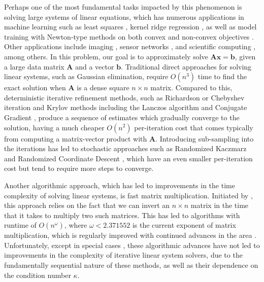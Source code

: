 \documentclass[11pt]{article}
\def\x{{\mathbf x}}
\def\b{{\mathbf b}}
\def\A{{\mathbf A}}
\begin{document}
Perhaps one of the most fundamental tasks impacted by this phenomenon is solving large systems of linear equations, which has numerous applications in machine learning such as least squares \cite{dieuleveut2017harder}, kernel ridge regression \cite{alaoui2015fast}, as well as model training with Newton-type methods on both convex and non-convex objectives \cite{erdogdu2015convergence,xu2020newton}. Other applications include imaging \cite{natterer, hounsfield_CAT}, sensor networks \cite{sensors}, and scientific computing \cite{xia2010superfast, wolters2008numerical}, among others. 
In this problem, our goal is to approximately solve $\A\x=\b$, given a large data matrix $\A$ and a vector $\b$. Traditional direct approaches for solving linear systems, such as Gaussian elimination, require $O(n^3)$ time to find the exact solution when $\A$ is a dense square $n\times n$ matrix. Compared to this, deterministic iterative refinement methods, such as Richardson or Chebyshev iteration \cite{golub1961chebyshev} and Krylov methods including the Lanczos algorithm and Conjugate Gradient \cite{saad1981krylov,liesen2013krylov}, produce a sequence of estimates which gradually converge to the solution, having a much cheaper $O(n^2)$ per-iteration cost that comes typically from computing a matrix-vector product with $\A$. Introducing sub-sampling into the iterations has led to stochastic approaches such as Randomized Kaczmarz \cite{Kac37:Angenaeherte-Aufloesung, SV09:Randomized-Kaczmarz} and Randomized Coordinate Descent \cite{nesterov2012efficiency}, which have an even smaller per-iteration cost but tend to require more steps to converge. 

Another algorithmic approach, which has led to improvements in the time complexity of solving linear systems, is fast matrix multiplication. Initiated by \cite{Strassen1969}, this approach relies on the fact that we can invert an $n\times n$ matrix in the time that it takes to  multiply two such matrices. This has led to algorithms with runtime of $O(n^\omega)$, where $\omega<2.371552$ is the current exponent of matrix multiplication, which is regularly improved with continued advances in the area \cite{pan1984multiply,coppersmith1987matrix,williams2012multiplying,williams2024multiplication}. Unfortunately, except in special cases \cite{peng2021solving}, these algorithmic advances have not led to improvements in the complexity of iterative linear system solvers, due to the fundamentally sequential nature of these methods, as well as their dependence on the condition number $\kappa$.
\end{document}

